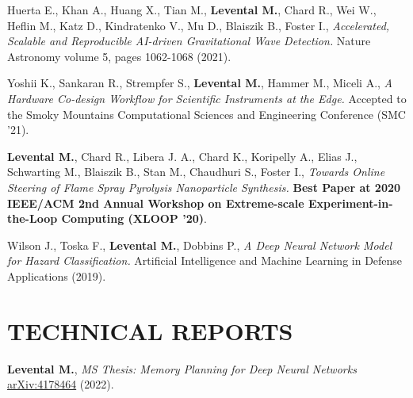 \documentclass[11pt,letterpaper,roman,colorlinks,linkcolor=blue]{moderncv}
\newcommand*{\modern}{\fontfamily{qhv}\selectfont}
\newcommand{\mystyle}[1]{\textcolor{mygrey}{\modern #1}}
\newcommand{\mysectionstyle}[1]{\large\mystyle{#1}}
\begin{document}

\begin{hangingpar}
Huerta E., Khan A., Huang X., Tian M., \textbf{Levental M.}, Chard R., Wei W., Heflin M., Katz D., Kindratenko V., Mu D., Blaiszik B., Foster I.,
\textit{Accelerated, Scalable and Reproducible AI-driven Gravitational Wave Detection.} 
Nature Astronomy volume 5, pages 1062-1068 (2021).
\end{hangingpar}

\begin{hangingpar}
Yoshii K., Sankaran R., Strempfer S., \textbf{Levental M.}, Hammer M., Miceli A.,
\textit{A Hardware Co-design Workflow for Scientific Instruments at the Edge.} 
Accepted to the Smoky Mountains Computational Sciences and Engineering Conference (SMC '21).
\end{hangingpar}

\begin{hangingpar}
\textbf{Levental M.}, Chard R., Libera J. A., Chard K., Koripelly A., Elias J., Schwarting M., Blaiszik B., Stan M., Chaudhuri S., Foster I.,
\textit{Towards Online Steering of Flame Spray Pyrolysis Nanoparticle Synthesis.} 
\textbf{Best Paper at 2020 IEEE/ACM 2nd Annual Workshop on Extreme-scale Experiment-in-the-Loop Computing (XLOOP '20)}.
\end{hangingpar}

\begin{hangingpar}
Wilson J., Toska F., \textbf{Levental M.}, Dobbins P.,
\textit{A Deep Neural Network Model for Hazard Classification.}
Artificial Intelligence and Machine Learning in Defense Applications (2019).
\end{hangingpar}

\section{\mysectionstyle{TECHNICAL REPORTS}}

\begin{hangingpar}
\textbf{Levental M.},
\textit{MS Thesis: Memory Planning for Deep Neural Networks} 
\href{https://arxiv.org/submit/4178464/view}{arXiv:4178464} (2022).
\end{hangingpar}
\end{document}
